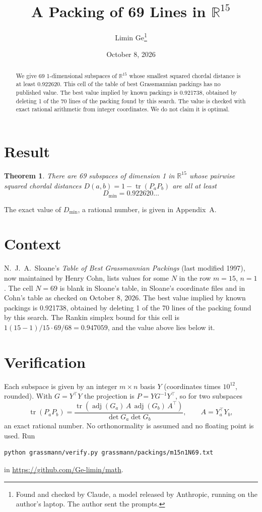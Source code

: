 \documentclass[11pt,a4paper]{article}
\title{A Packing of 69 Lines in $\mathbb{R}^{15}$}
\author{Limin Ge\thanks{Found and checked by Claude, a model released by Anthropic, running on the author's laptop. The author sent the prompts.}}
\date{October 8, 2026}
\newtheorem*{theorem}{Theorem}
\begin{document}
\maketitle
\begin{abstract}
We give 69 1-dimensional subspaces of $\mathbb{R}^{15}$ whose smallest squared chordal distance is at least 0.922620. This cell of the table of best Grassmannian packings has no published value. The best value implied by known packings is 0.921738, obtained by deleting 1 of the 70 lines of the packing found by this search. The value is checked with exact rational arithmetic from integer coordinates. We do not claim it is optimal.
\end{abstract}

\section{Result}
\begin{theorem}
There are 69 subspaces of dimension 1 in $\mathbb{R}^{15}$ whose pairwise squared chordal distances $D(a,b) = 1 - \operatorname{tr}(P_aP_b)$ are all at least
\[ D_{\min} = 0.922620\ldots \]
\end{theorem}
The exact value of $D_{\min}$, a rational number, is given in Appendix~A.


\section{Context}
N.~J.~A.~Sloane's \emph{Table of Best Grassmannian Packings} (last modified 1997), now maintained by Henry Cohn, lists values for some $N$ in the row $m=15$, $n=1$. The cell $N=69$ is blank in Sloane's table, in Sloane's coordinate files and in Cohn's table as checked on October 8, 2026. The best value implied by known packings is 0.921738, obtained by deleting 1 of the 70 lines of the packing found by this search. The Rankin simplex bound for this cell is $1(15-1)/15\cdot 69/68 = 0.947059$, and the value above lies below it.


\section{Verification}
Each subspace is given by an integer $m\times n$ basis $Y$ (coordinates times $10^{12}$, rounded). With $G=Y^\top Y$ the projection is $P=YG^{-1}Y^\top$, so for two subspaces
\[ \operatorname{tr}(P_aP_b)=\frac{\operatorname{tr}(\operatorname{adj}(G_a)\,A\,\operatorname{adj}(G_b)\,A^\top)}{\det G_a\det G_b},\qquad A=Y_a^\top Y_b, \]
an exact rational number. No orthonormality is assumed and no floating point is used. Run
\begin{verbatim}
python grassmann/verify.py grassmann/packings/m15n1N69.txt
\end{verbatim}
in \url{https://github.com/Ge-limin/math}.
\end{document}
